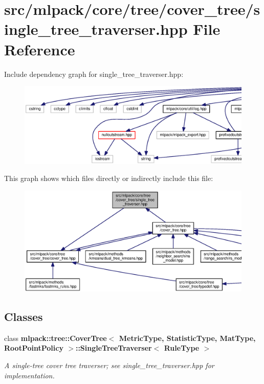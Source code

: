 \section{src/mlpack/core/tree/cover\+\_\+tree/single\+\_\+tree\+\_\+traverser.hpp File Reference}
\label{cover__tree_2single__tree__traverser_8hpp}
Include dependency graph for single\+\_\+tree\+\_\+traverser.\+hpp\+:
\nopagebreak
\begin{figure}[H]
\begin{center}
\leavevmode
\includegraphics[width=350pt]{cover__tree_2single__tree__traverser_8hpp__incl}
\end{center}
\end{figure}
This graph shows which files directly or indirectly include this file\+:
\nopagebreak
\begin{figure}[H]
\begin{center}
\leavevmode
\includegraphics[width=350pt]{cover__tree_2single__tree__traverser_8hpp__dep__incl}
\end{center}
\end{figure}
\subsection*{Classes}
\begin{DoxyCompactItemize}
\item 
class {\bf mlpack\+::tree\+::\+Cover\+Tree$<$ Metric\+Type, Statistic\+Type, Mat\+Type, Root\+Point\+Policy $>$\+::\+Single\+Tree\+Traverser$<$ Rule\+Type $>$}
\begin{DoxyCompactList}\small\item\em A single-\/tree cover tree traverser; see single\+\_\+tree\+\_\+traverser.\+hpp for implementation. \end{DoxyCompactList}\end{DoxyCompactItemize}
